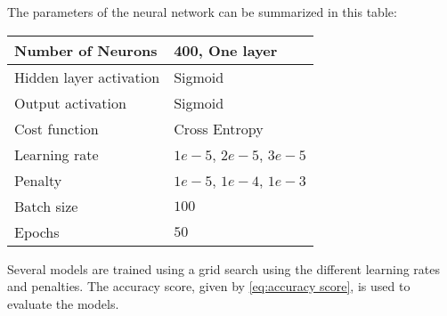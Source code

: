 The parameters of the neural network can be summarized in this table:

\begin{table}[H]
\begin{tabular}{|l|l|}
\hline
Number of Neurons & 400, One layer  \\ \hline
Hidden layer activation & Sigmoid   \\ \hline
Output activation & Sigmoid  \\ \hline
Cost function & Cross Entropy \\ \hline
Learning rate & $1e-5$, $2e-5$, $3e-5$  \\ \hline
Penalty & $1e-5$, $1e-4$, $1e-3$  \\ \hline
Batch size & $100$  \\ \hline
Epochs & $50$  \\ \hline
\end{tabular}
\end{table}

Several models are trained using a grid search using the different learning rates 
and penalties. The accuracy score, given by \autoref{eq:accuracy score}, is used to evaluate the models.
